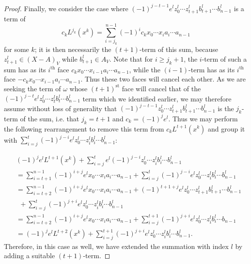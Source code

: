 \begin{proof}
Finally, we consider the case where $(-1)^{j-t-1} e^l z^l_0 \cdots z^l_{t+1} b^l_{t+1} \cdots b^l_{n-1}$ is a term of 
\[c_k L^{j_k}(x^k) = \sum\limits_{i = j_k}^{n-1}(-1)^{i} c_k  x_0 \cdots x_i a_i \cdots a_{n-1}\]
for some $k$; it is then necessarily the $(t+1)$-term of this sum, because $z^l_{t+1} \in (X - A)_V$ while $b^l_{t+1} \in A_V$. 
Note that for $i \geq j_k + 1$, the $i$-term of such a sum has as its $i^{\mathrm{th}}$ face $c_k x_0 \cdots x_{i-1} a_i \cdots a_{n-1}$, while the $(i-1)$-term has as its $i^{\mathrm{th}}$ face $-c_k x_0 \cdots x_{i-1} a_i \cdots a_{n-1}$. Thus these two faces will cancel each other. As we are seeking the term of $\omega$ whose $(t+1)^{\mathrm{st}}$ face will cancel that of the $(-1)^{j-t} e^l z^l_0 \cdots z^l_t b^l_t \cdots b^l_{n-1}$ term which we identified earlier, we may therefore assume without loss of generality that $(-1)^{j-t-1} z^l_0 \cdots z^l_{t+1} b^l_{t+1} \cdots b^l_{n-1}$ is the $j_k$-term of the sum, i.e.  that $j_k = t + 1$ and $c_k = (-1)^j e^l$. Thus we may perform the following rearrangement to remove this term from $c_k L^{t+1}(x^k)$ and group it with $\sum_{i = j}^{t} (-1)^{j-i} e^l z^l_0 \cdots z^l_i b^l_i \cdots b^l_{n-1}$:

\begin{align*}
& (-1)^j e^l L^{t+1}(x^k) + \sum_{i = j}^{t} e^l (-1)^{j-i} z^l_0 \cdots z^l_i b^l_i \cdots b^l_{n-1} \\
&= \sum\limits_{i = t+1}^{n-1} (-1)^{i+j} e^l x_0 \cdots x_i a_i \cdots a_{n-1} + \sum_{i = j}^{t} (-1)^{j-i} e^l z^l_0 \cdots z^l_i b^l_i \cdots b^l_{n-1} \\
&= \sum\limits_{i = t + 2}^{n-1} (-1)^{i+j} e^l x_0 \cdots x_i a_i \cdots a_{n-1} + (-1)^{t+1+j} e^l z^l_0 \cdots z^l_{t+1} b^l_{t+1} \cdots b^l_{n-1} \\ 
&\ \ + \sum_{i = j}^{t} (-1)^{j+i} e^l z^l_0 \cdots z^l_i b^l_i \cdots b^l_{n-1} \\
&= \sum\limits_{i = t + 2}^{n-1} (-1)^{i+j} e^l x_0 \cdots x_i a_i \cdots a_{n-1} + \sum_{i = j}^{t+1} (-1)^{j+i} e^l z^l_0 \cdots z^l_i b^l_i \cdots b_{n-1} \\
&= (-1)^{j} e^l L^{t+2}(x^k) + \sum_{i = j}^{t+1} (-1)^{j+i} e^l z^l_0 \cdots z^l_i b^l_i \cdots b^l_{n-1}.
\end{align*}
Therefore, in this case as well, we have extended the summation with index $l$ by adding a suitable $(t+1)$-term.


\end{proof}
